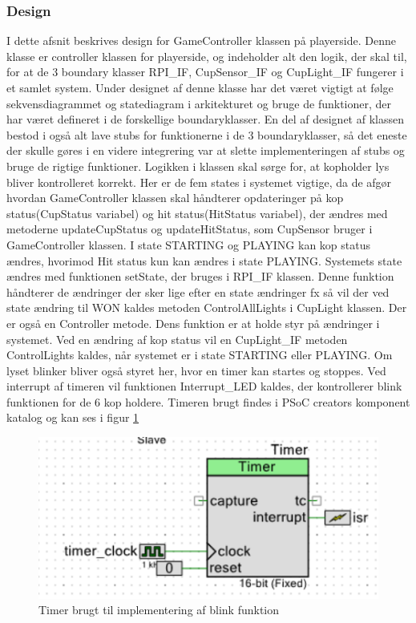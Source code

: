 \documentclass[Rapport/Playerside/GameController/GameController.tex]{subfiles}
\begin{document}
\subsubsection{Design}
I dette afsnit beskrives design for GameController klassen på playerside. Denne klasse er controller klassen for playerside, og indeholder alt den logik, der skal til, for at de 3 boundary klasser RPI\_IF, CupSensor\_IF og CupLight\_IF fungerer i et samlet system. Under designet af denne klasse har det været vigtigt at følge sekvensdiagrammet og statediagram i arkitekturet og bruge de funktioner, der har været defineret i de forskellige boundaryklasser. En del af designet af klassen bestod i også alt lave stubs for funktionerne i de 3 boundaryklasser, så det eneste der skulle gøres i en videre integrering var at slette implementeringen af stubs og bruge de rigtige funktioner. Logikken i klassen skal sørge for, at kopholder lys bliver kontrolleret korrekt. Her er de fem states i systemet vigtige, da de afgør hvordan GameController klassen skal håndterer opdateringer på kop status(CupStatus variabel) og hit status(HitStatus variabel), der ændres med metoderne updateCupStatus og updateHitStatus, som CupSensor bruger i GameController klassen. I state STARTING og PLAYING kan kop status ændres, hvorimod Hit status kun kan ændres i state PLAYING. Systemets state ændres med funktionen setState, der bruges i RPI\_IF klassen. Denne funktion håndterer de ændringer der sker lige efter en state ændringer fx så vil der ved state ændring til WON kaldes metoden ControlAllLights i CupLight klassen. Der er også en Controller metode. Dens funktion er at holde styr på ændringer i systemet. Ved en ændring af kop status vil en CupLight\_IF metoden ControlLights kaldes, når systemet er i state STARTING eller PLAYING. Om lyset blinker bliver også styret her, hvor en timer kan startes og stoppes. Ved interrupt af timeren vil funktionen Interrupt\_LED kaldes, der kontrollerer blink funktionen for de 6 kop holdere. Timeren brugt findes i PSoC creators komponent katalog og kan ses i figur \ref{fig:Timer}
\begin{figure}
    \centering 
    \includegraphics[width=0.5\linewidth]{Softwaredesign/GameController/graphic/gamecontroller_timer.PNG}
    \caption{Timer brugt til implementering af blink funktion}
    \label{fig:Timer}
\end{figure}
\end{document}

